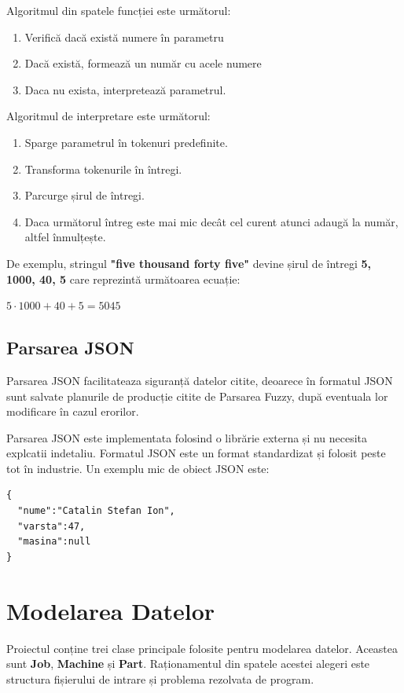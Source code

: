 \documentclass[12pt, twoside]{article}
\begin{document}
\vspace{1cm}
Algoritmul din spatele funcției este următorul:
\begin{enumerate}
  \item Verifică dacă există numere în parametru
  \item Dacă există, formează un număr cu acele numere
  \item Daca nu exista, interpretează parametrul.
\end{enumerate}
Algoritmul de interpretare este următorul:
\begin{enumerate}
  \item Sparge parametrul în tokenuri predefinite.
  \item Transforma tokenurile în întregi.
  \item Parcurge șirul de întregi.
  \item Daca următorul întreg este mai mic decât cel curent atunci adaugă la număr, altfel înmulțește.
\end{enumerate}


De exemplu, stringul \textbf{"five thousand forty five"}
devine șirul de întregi \textbf{{5, 1000, 40, 5}} care
reprezintă următoarea ecuație:
\begin{center}
  $5 \cdot 1000 + 40 + 5 = 5045$
\end{center}

\subsection{Parsarea JSON}
Parsarea JSON facilitateaza siguranță datelor citite, deoarece
în formatul JSON sunt salvate planurile de producție
citite de Parsarea Fuzzy, după eventuala lor modificare
în cazul erorilor.


Parsarea JSON este implementata folosind o librărie externa
și nu necesita explcatii indetaliu. Formatul JSON este un
format standardizat și folosit peste tot în industrie.
Un exemplu mic de obiect JSON este:

\begin{lstlisting}[frame={single}]
{
  "nume":"Catalin Stefan Ion",
  "varsta":47,
  "masina":null
}
\end{lstlisting}

\section{Modelarea Datelor}
Proiectul conține trei clase principale folosite
pentru modelarea datelor. Aceastea sunt \textbf{Job},
\textbf{Machine} și \textbf{Part}. Raționamentul din
spatele acestei alegeri este structura fișierului de
intrare și problema rezolvata de program.
\end{document}
